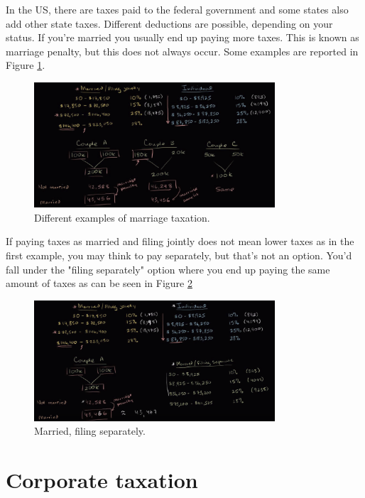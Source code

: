 In the US, there are taxes paid to the federal government and some states also add other state taxes. Different deductions are possible, depending on your status. If you're married you usually end up paying more taxes. This is known as marriage penalty, but this does not always occur. Some examples are reported in Figure \ref{fig:marriage_penalty}. 

\begin{figure}[h!]
\centering
\includegraphics[width=0.8\textwidth]{images/marriage_penalty.png}
\caption{Different examples of marriage taxation.}
\label{fig:marriage_penalty}
\end{figure}

If paying taxes as married and filing jointly does not mean lower taxes as in the first example, you may think to pay separately, but that's not an option. You'd fall under the "filing separately" option where you end up paying the same amount of taxes as can be seen in Figure \ref{fig:marriage_separately} 

\begin{figure}[h!]
\centering
\includegraphics[width=0.8\textwidth]{images/marriage_separately.png}
\caption{Married, filing separately.}
\label{fig:marriage_separately}
\end{figure}

\section{Corporate taxation}

